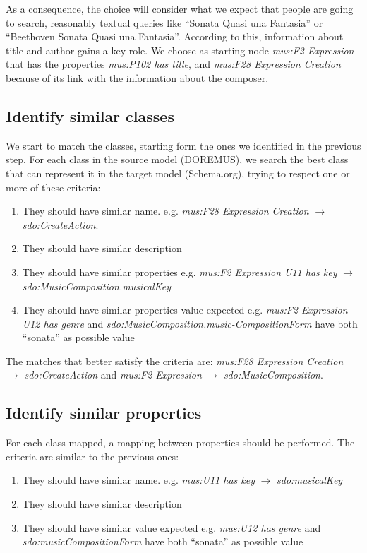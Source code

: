 \documentclass{llncs}
\begin{document}
As a consequence, the choice will consider what we expect that people are going to search, reasonably textual queries like ``Sonata Quasi una Fantasia'' or ``Beethoven Sonata Quasi una Fantasia''. According to this, information about title and author gains a key role. We choose as starting node \textit{mus:F2 Expression} that has the properties \textit{mus:P102 has title}, and \textit{mus:F28 Expression Creation} because of its link with the information about the composer.

\subsection{Identify similar classes}
\label{sec:classmap}
We start to match the classes, starting form the ones we identified in the previous step. For each class in the source model (DOREMUS), we search the best class that can represent it in the target model (Schema.org), trying to respect one or more of these criteria:
\begin{enumerate}
 \item{
They should have similar name.\newline
e.g. \textit{mus:F28 Expression Creation} $\rightarrow$ \textit{sdo:CreateAction}.
}
 \item{They should have similar description}
 \item{They should have similar properties\newline
e.g. \textit{mus:F2 Expression U11 has key} $\rightarrow$ \textit{sdo:MusicComposition.musicalKey}
}
 \item{They should have similar properties value expected\newline
e.g. \textit{mus:F2 Expression U12 has genre} and \textit{sdo:MusicComposition.music-CompositionForm} have both “sonata” as possible value}
\end{enumerate}

The matches that better satisfy the criteria are: \textit{mus:F28 Expression Creation} $\rightarrow$  \textit{sdo:CreateAction} and \textit{mus:F2 Expression} $\rightarrow$  \textit{sdo:MusicComposition}.

\subsection{Identify similar properties}
    \label{sec:propmap}
For each class mapped, a mapping between properties should be performed. The criteria are similar to the previous ones:
\begin{enumerate}
\item{
 They should have similar name.\newline
e.g. \textit{mus:U11 has key} $\rightarrow$ \textit{sdo:musicalKey}
}
 \item{They should have similar description}
 \item{They should have similar value expected\newline
e.g. \textit{mus:U12 has genre} and \textit{sdo:musicCompositionForm} have both “sonata” as possible value}
\end{enumerate}
\end{document}
